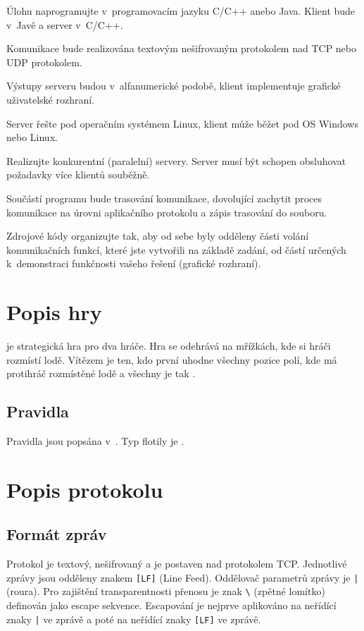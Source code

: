\documentclass[a4paper, 12pt]{report}
\begin{document}
Úlohu naprogramujte v~programovacím jazyku C/C++ anebo Java. Klient bude v~Javě a server v~C/C++.

Komunikace bude realizována textovým nešifrovaným protokolem nad TCP nebo UDP protokolem.

Výstupy serveru budou v~alfanumerické podobě, klient implementuje grafické uživatelské rozhraní.

Server řešte pod operačním systémem Linux, klient může běžet pod OS Windows nebo Linux.

Realizujte konkurentní (paralelní) servery. Server musí být schopen obsluhovat požadavky více klientů souběžně.

Součástí programu bude trasování komunikace, dovolující zachytit proces komunikace na úrovni aplikačního protokolu a zápis trasování do souboru.

Zdrojové kódy organizujte tak, aby od sebe byly odděleny části volání komunikačních funkcí, které jste vytvořili na základě zadání, od částí určených k~demonstraci funkčnosti vašeho řešení (grafické rozhraní).

\chapter{Popis hry}

 je strategická hra pro dva hráče. Hra se odehrává na mřížkách, kde si hráči rozmístí lodě. Vítězem je ten, kdo první uhodne všechny pozice polí, kde má protihráč rozmístěné lodě a všechny je tak .

\section{Pravidla}

Pravidla jsou popsána v~\cite{wiki-battleship}. Typ flotily je .

\chapter{Popis protokolu}

\section{Formát zpráv}

Protokol je textový, nešifrovaný a je postaven nad protokolem TCP. Jednotlivé zprávy jsou odděleny znakem \texttt{[LF]} (Line Feed). Oddělovač parametrů zprávy je \texttt{|} (roura). Pro zajištění transparentnosti přenosu je znak \texttt{\textbackslash} (zpětné lomítko) definován jako escape sekvence. Escapování je nejprve aplikováno na neřídící znaky \texttt{|} ve zprávě a poté na neřídící znaky \texttt{[LF]} ve zprávě.
\end{document}
